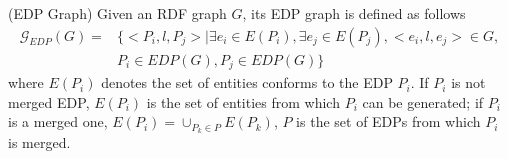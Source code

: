 \begin{definition} 
\label{edp:edpgraph} (EDP Graph) Given an RDF graph $G$, its EDP graph is defined as follows
\begin{equation}
\begin{split}
\mathcal{G}_{EDP}(G)= & 
\{<P_i,l,P_j>|\exists e_i \in E(P_i ), \exists e_j \in E(P_j ),<e_i,l,e_j> \in G, \\ 
& P_i \in EDP(G),P_j \in EDP(G) \}
\end{split}
\end{equation}
where $E(P_i)$ denotes the set of entities conforms to the EDP $P_i$. If $P_i$ is not merged EDP, $E(P_i)$ is the set of entities from which $P_i$ can be generated; if $P_i$  is a merged one, $E(P_i )=\cup_{P_k \in P}{E(P_k)}$, $P$ is the set of EDPs from which $P_i$  is merged.
\end{definition}
